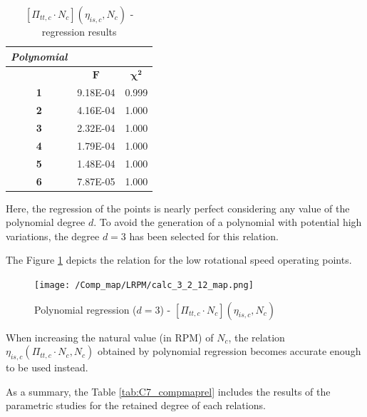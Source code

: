 \begin{longtable}[c]{@{}ccc@{}}
\caption{$[\Pi_{tt,c}\cdot N_c](\eta_{is,c},N_c)$ - regression results }
\label{tab:C7_regcomp5}\\
\toprule
\textit{\textbf{Polynomial}} & &  \\* \midrule
\endfirsthead
%
\endhead
%
\bottomrule
\endfoot
%
\endlastfoot
%
\multicolumn{1}{c}{\textbf{Degree}}              & \multicolumn{1}{c}{$\mathbf{F}$}            & \multicolumn{1}{c}{$\mathbf{\chi^2}$}                  \\
\multicolumn{1}{c}{\textbf{1}}                   & 9.18E-04   & 0.999             \\
\multicolumn{1}{c}{\textbf{2}}                   & 4.16E-04   & 1.000             \\
\multicolumn{1}{c}{\textbf{3}}                   & 2.32E-04   & 1.000             \\
\multicolumn{1}{c}{\textbf{4}}                   & 1.79E-04   & 1.000             \\
\multicolumn{1}{c}{\textbf{5}}                   & 1.48E-04   & 1.000             \\
\multicolumn{1}{c}{\textbf{6}}                   & 7.87E-05   & 1.000             \\* \bottomrule
\end{longtable}
Here, the regression of the points is nearly perfect considering any value of the polynomial degree $d$. To avoid the generation of a polynomial with potential high variations, the degree $d=3$ has been selected for this relation.

The Figure \ref{fig:C7_polycomp_eta3_LRPM} depicts the relation for the low rotational speed operating points.

\begin{figure}[H]
    \centering
    \texttt{[image: /Comp\_map/LRPM/calc\_3\_2\_12\_map.png]}
    \caption{Polynomial regression ($d=3$) - $[\Pi_{tt,c}\cdot N_c](\eta_{is,c},N_c)$}
    \label{fig:C7_polycomp_eta3_LRPM}
\end{figure}
    
When increasing the natural value (in RPM) of $N_c$, the relation $\eta_{is,c}(\Pi_{tt,c}\cdot N_c,N_c)$ obtained by polynomial regression becomes accurate enough to be used instead. 

As a summary, the Table \ref{tab:C7_compmaprel} includes the results of the parametric studies for the retained degree of each relations. 

